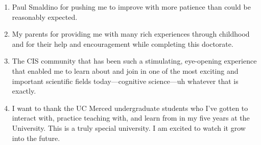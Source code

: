 \documentclass[12pt,chapterheads]{UCMerced}
\begin{document}
\begin{frontmatter}

\begin{acknowledgements} 
  \begin{enumerate}
    \item 
      Paul Smaldino for pushing me to improve with more patience than could
      be reasonably expected. 
    \item
      My parents for providing me with many rich experiences through childhood
      and for their help and encouragement while completing this doctorate.
    \item
      The CIS community that has been such a stimulating, eye-opening experience
      that enabled me to learn about and join in one of the most exciting
      and important scientific fields today---cognitive science---uh whatever
      that is exactly.
    \item
      I want to thank the UC Merced undergraduate students who I've gotten to 
      interact with, practice teaching with, and learn from in my five years
      at the University. This is a truly special university. I am excited to
      watch it grow into the future.
  \end{enumerate}
\end{acknowledgements}



\end{frontmatter}
\end{document}

